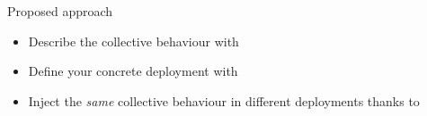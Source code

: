 \begin{frame}{Proposed approach}
  \begin{cardTiny}
    \begin{itemize}
      \item<1-> Describe the collective behaviour with 
      \item<2-> Define your concrete deployment with 
      \item<3-> Inject the \textit{same} collective behaviour in different deployments thanks to ~\cite{DBLP:journals/fi/CasadeiPPVW20}
    \end{itemize}
  \end{cardTiny}
  \begin{columns}[onlytextwidth, t]
    \begin{column}{0.27\textwidth}
      \begin{adjustbox}{max width=\textwidth, valign=m, margin=0}
      \end{adjustbox}
    \end{column}
    \begin{column}{0.32\textwidth}
      \begin{adjustbox}{max width=\textwidth, valign=m}
      \end{adjustbox}
    \end{column}
    \begin{column}{0.25\textwidth}
      \begin{adjustbox}{max width=\textwidth, valign=m}
      \end{adjustbox}
    \end{column}
  \end{columns}
\end{frame}
